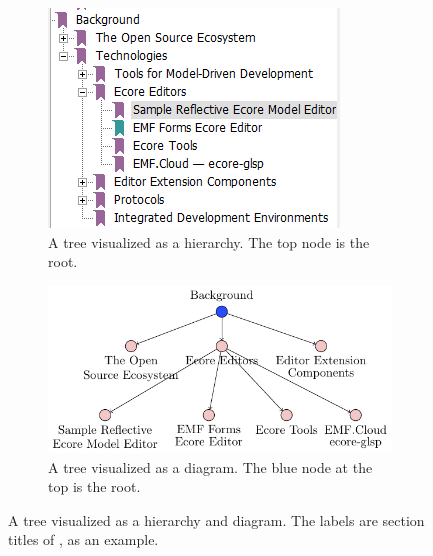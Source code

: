 \begin{figure}[htbp]
    \centering
    \begin{subfigure}[b]{.45\textwidth}
        \centering
        \includegraphics[width=\textwidth]{figures/tree-hierarchy.png}
        \caption{A tree visualized as a hierarchy. The top node is the root.}\label{sfig:tree-visualized-hierarchy}
    \end{subfigure}
    \hfill
    \begin{subfigure}[b]{.45\textwidth}
        \centering
        \includegraphics[width=\textwidth]{figures/tree-diagram.pdf}
        \caption{A tree visualized as a diagram. The blue node at the top is the root.}\label{sfig:tree-visualized-diagram}
    \end{subfigure}
    \caption{A tree visualized as a hierarchy and diagram. The labels are section titles of \cite{rekstadModelingEnvironmentCloud2020}, as an example.}\label{fig:tree-visualized}
\end{figure}

